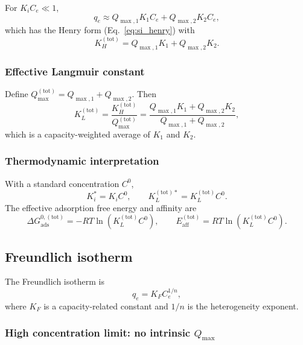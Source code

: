 \documentclass[journal=jacsat,manuscript=article]{achemso}
\begin{document}
For \(K_i C_e \ll 1\),
\begin{equation}
	q_e \approx Q_{\max,1} K_1 C_e + Q_{\max,2} K_2 C_e,
\end{equation}
which has the Henry form (Eq.~\eqref{eq:si_henry}) with
\begin{equation}
	K_H^{\mathrm{(tot)}}
	= Q_{\max,1} K_1 + Q_{\max,2} K_2.
\end{equation}


\subsubsection{Effective Langmuir constant}

Define \(Q_{\max}^{\mathrm{(tot)}} = Q_{\max,1} + Q_{\max,2}\). Then
\begin{equation}
	K_L^{\mathrm{(tot)}}
	= \frac{K_H^{\mathrm{(tot)}}}{Q_{\max}^{\mathrm{(tot)}}}
	= \frac{Q_{\max,1} K_1 + Q_{\max,2} K_2}
	{Q_{\max,1} + Q_{\max,2}},
\end{equation}
which is a capacity-weighted average of \(K_1\) and \(K_2\).

\subsubsection{Thermodynamic interpretation}

With a standard concentration \(C^0\),
\begin{equation}
	K_i^{\ast} = K_i C^0,
	\qquad
	K_L^{\mathrm{(tot)}\ast} = K_L^{\mathrm{(tot)}} C^0.
\end{equation}
The effective adsorption free energy and affinity are
\begin{equation}
	\Delta G_{\mathrm{ads}}^{0,\mathrm{(tot)}}
	= - R T \ln\left( K_L^{\mathrm{(tot)}} C^0 \right),
	\qquad
	E_{\mathrm{aff}}^{\mathrm{(tot)}}
	= R T \ln\left( K_L^{\mathrm{(tot)}} C^0 \right).
\end{equation}

\subsection{Freundlich isotherm}
\label{sec:si_freundlich}

The Freundlich isotherm is
\begin{equation}
	q_e = K_F C_e^{1/n},
	\label{eq:si_freundlich}
\end{equation}
where \(K_F\) is a capacity-related constant and \(1/n\) is the
heterogeneity exponent.

\subsubsection{High concentration limit: no intrinsic \(Q_{\max}\)}
\end{document}
